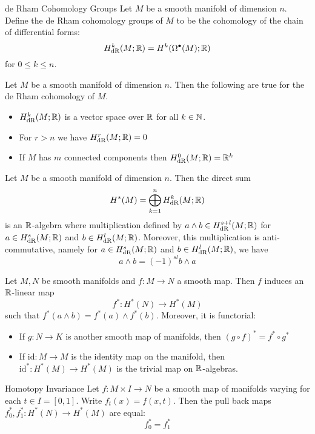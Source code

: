 \documentclass[a4paper]{article}
\begin{document}
\begin{defn}{de Rham Cohomology Groups}{} Let $M$ be a smooth manifold of dimension $n$. Define the de Rham cohomology groups of $M$ to be the cohomology of the chain of differential forms: $$H_{\text{dR}}^k(M;\mathbb{R})=H^k(\Omega^\bullet(M);\mathbb{R})$$ for $0\leq k\leq n$. 
\end{defn}

\begin{prp}{}{} Let $M$ be a smooth manifold of dimension $n$. Then the following are true for the de Rham cohomology of $M$. 
\begin{itemize}
\item $H_{\text{dR}}^k(M;\mathbb{R})$ is a vector space over $\mathbb{R}$ for all $k\in\mathbb{N}$. 
\item For $r>n$ we have $H_{\text{dR}}^r(M;\mathbb{R})=0$
\item If $M$ has $m$ connected components then $H_{\text{dR}}^0(M;\mathbb{R})=\mathbb{R}^k$
\end{itemize}
\end{prp}

\begin{thm}{}{} Let $M$ be a smooth manifold of dimension $n$. Then the direct sum $$H^\ast(M)=\bigoplus_{k=1}^nH_{\text{dR}}^k(M;\mathbb{R})$$ is an $\mathbb{R}$-algebra where multiplication defined by $a\wedge b\in H_{\text{dR}}^{s+l}(M;\mathbb{R})$ for $a\in H_{\text{dR}}^s(M;\mathbb{R})$ and $b\in H_{\text{dR}}^l(M;\mathbb{R})$. Moreover, this multiplication is anti-commutative, namely for $a\in H_{\text{dR}}^s(M;\mathbb{R})$ and $b\in H_{\text{dR}}^l(M;\mathbb{R})$, we have $$a\wedge b=(-1)^{sl}b\wedge a$$
\end{thm}

\begin{prp}{}{} Let $M,N$ be smooth manifolds and $f:M\to N$ a smooth map. Then $f$ induces an $\mathbb{R}$-linear map $$f^\ast:H^\ast(N)\to H^\ast(M)$$ such that $f^\ast(a\wedge b)=f^\ast(a)\wedge f^\ast(b)$. Moreover, it is functorial: 
\begin{itemize}
\item If $g:N\to K$ is another smooth map of manifolds, then $(g\circ f)^\ast=f^\ast\circ g^\ast$
\item If $\text{id}:M\to M$ is the identity map on the manifold, then $\text{id}^\ast:H^\ast(M)\to H^\ast(M)$ is the trivial map on $\mathbb{R}$-algebras. 
\end{itemize}
\end{prp}

\begin{thm}{Homotopy Invariance}{} Let $f:M\times I\to N$ be a smooth map of manifolds varying for each $t\in I=[0,1]$. Write $f_t(x)=f(x,t)$. Then the pull back maps $f_0^\ast,f_1^\ast:H^\ast(N)\to H^\ast(M)$ are equal: $$f_0^\ast=f_1^\ast$$
\end{thm}
\end{document}
